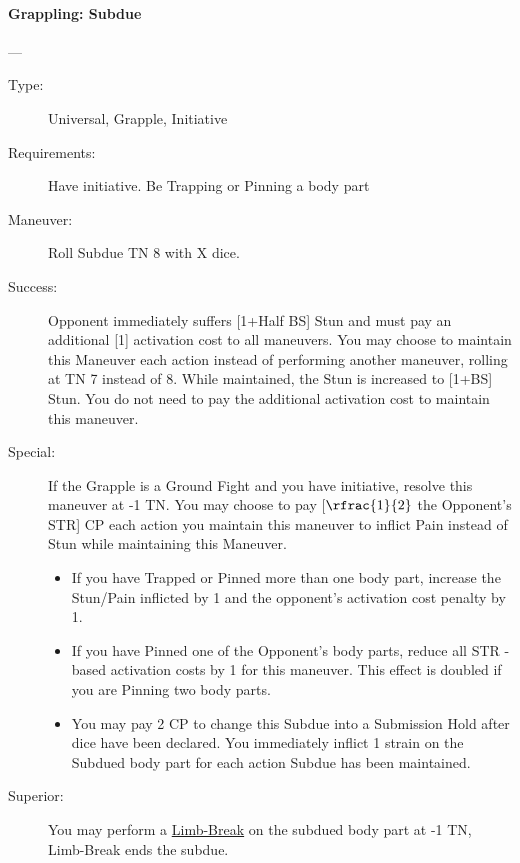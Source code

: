 \paragraph{Grappling: Subdue \large} \label{man:grappling-subdue}
---
\vspace{-10pt} \begin{description}
\item [Type:] Universal, Grapple, Initiative
\item [Requirements:] Have initiative. Be Trapping or Pinning a body part
\item [Maneuver:] Roll Subdue TN 8 with X dice.
\item [Success:] Opponent immediately suffers [1+Half BS] Stun and must pay an
additional [1] activation cost to all maneuvers. You may choose to maintain this
Maneuver each action instead of performing another maneuver, rolling at TN 7
instead of 8. While maintained, the Stun is increased to [1+BS] Stun. You do not
need to pay the additional activation cost to maintain this maneuver. 

\item [Special:] If the Grapple is a Ground Fight and you have initiative,
  resolve this maneuver at -1 TN. You may choose to pay [$\rfrac{1}{2}$ the
  Opponent’s STR] CP each action you maintain this maneuver to inflict Pain
  instead of Stun while maintaining this Maneuver. 
  \begin{itemize}
  \item If you have Trapped or Pinned more than one body part, increase the
    Stun/Pain inflicted by 1 and the opponent’s activation cost penalty by 1.  
  \item If you have Pinned one of the Opponent’s body parts, reduce all STR
    -based activation costs by 1 for this maneuver. This effect is doubled if you
  are Pinning two body parts.  
  \item You may pay 2 CP to change this Subdue into a Submission Hold after dice
    have been declared. You immediately inflict 1 strain on the Subdued body part
  for each action Subdue has been maintained.  
  \end{itemize}
\item [Superior:] You may perform a
  \hyperref[man:grappling-limb-break]{Limb-Break} on the subdued body part at -1
  TN, Limb-Break ends the subdue.    
\end{description}


